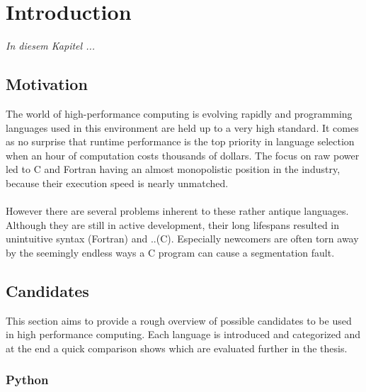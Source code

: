 \chapter{Introduction}
\label{chap:Introduction}

\textit{%
In diesem Kapitel ...
}
\bigskip

\section{Motivation}
\label{sec:Motivation}

The world of high-performance computing is evolving rapidly and programming languages used in
this environment are held up to a very high standard. It comes as no surprise that runtime performance
is the top priority in language selection when an hour of computation costs thousands of dollars.
The focus on raw power led to C and Fortran having an almost monopolistic position in the industry,
because their execution speed is nearly unmatched.
\\ \\
However there are several problems inherent to these rather antique languages. Although they are
still in active development, their long lifespans resulted in unintuitive syntax (Fortran) and ..(C).
Especially newcomers are often torn away by the seemingly endless ways a C program can cause a
segmentation fault.

\section{Candidates}
\label{sec:Candidates}

This section aims to provide a rough overview of possible candidates to be used in high performance
computing. Each language is introduced and categorized and at the end a quick comparison shows which
are evaluated further in the thesis.

\subsection*{Python}
\label{ssec:Candidates.Python}

